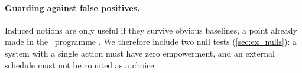 \paragraph{Guarding against false positives.}
Induced notions are only useful if they survive obvious baselines, a point already made in the \SBT\ programme \citep{six_birds_life}. We therefore include two null tests (\cref{sec:ex_nulls}): a system with a single action must have zero empowerment, and an external schedule must not be counted as a choice.
